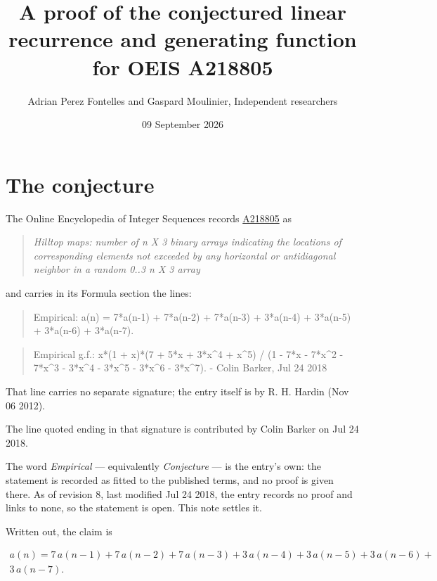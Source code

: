 \documentclass[11pt]{article}
\title{A proof of the conjectured linear recurrence and generating function for OEIS A218805}
\author{Adrian Perez Fontelles and Gaspard Moulinier, Independent researchers}
\date{09 September 2026}
\theoremstyle{definition}
\begin{document}
\maketitle
\section{The conjecture}

The Online Encyclopedia of Integer Sequences records \href{https://oeis.org/A218805}{A218805} as

\begin{quote}\itshape Hilltop maps: number of n X 3 binary arrays indicating the locations of corresponding elements not exceeded by any horizontal or antidiagonal neighbor in a random 0..3 n X 3 array\end{quote}

and carries in its Formula section the lines:

\begin{quote}\ttfamily Empirical: a(n) = 7*a(n-1) + 7*a(n-2) + 7*a(n-3) + 3*a(n-4) + 3*a(n-5) + 3*a(n-6) + 3*a(n-7).\end{quote}

\begin{quote}\ttfamily Empirical g.f.: x*(1 + x)*(7 + 5*x + 3*x\textasciicircum{}4 + x\textasciicircum{}5) / (1 - 7*x - 7*x\textasciicircum{}2 - 7*x\textasciicircum{}3 - 3*x\textasciicircum{}4 - 3*x\textasciicircum{}5 - 3*x\textasciicircum{}6 - 3*x\textasciicircum{}7). - Colin Barker, Jul 24 2018\end{quote}

That line carries no separate signature; the entry itself is by R. H. Hardin (Nov 06 2012).

The line quoted ending in that signature is contributed by Colin Barker on Jul 24 2018.

The word {\itshape Empirical} --- equivalently {\itshape Conjecture} --- is the entry's own: the statement is recorded as fitted to the published terms, and no proof is given there. As of revision 8, last modified Jul 24 2018, the entry records no proof and links to none, so the statement is open. This note settles it.

Written out, the claim is

\begin{multline*} a(n) = 7\,a(n-1) + 7\,a(n-2) + 7\,a(n-3) + 3\,a(n-4) + 3\,a(n-5) + 3\,a(n-6) + \\ 3\,a(n-7). \end{multline*}
\end{document}
